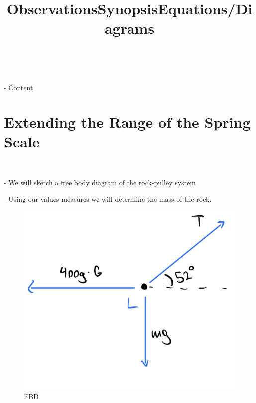 \documentclass[letter paper, title page]{article}
\begin{document}
\noindent
\title{\textbf{Observations}}

\begin{list}
    \\\item - Content
\end{list}

\newpage

\section*{Extending the Range of the Spring Scale}

\noindent
\title{\textbf{Synopsis}}

\begin{list}
    \\\item - We will sketch a free body diagram of the rock-pulley system

            - Using our values measures we will determine the mass of the rock. 
\end{list}

\noindent
\title{\textbf{Equations/Diagrams}}

\begin{figure}[H]
    \centering
    \includegraphics[scale = 0.1]{IMG_0057.png}
    \caption{FBD}
    \label{fig:my_label}
\end{figure}
\end{document}
